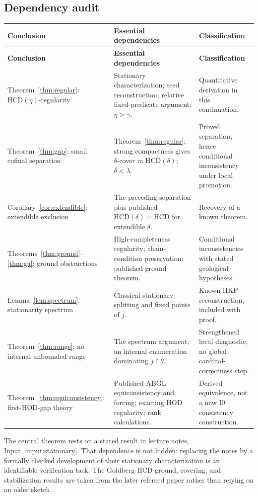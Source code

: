 \documentclass[11pt,letterpaper]{article}
\theoremstyle{definition}
\newcommand{\restr}{\mathbin{\upharpoonright}}
\newcommand{\Izero}{\mathrm{I0}}
\newcommand{\HCD}{\mathrm{HCD}}
\theoremstyle{remark}
\begin{document}
\subsection{Dependency audit}

\begingroup\small
\renewcommand{\arraystretch}{1.16}
\begin{longtable}{@{}P{.23\textwidth}P{.40\textwidth}P{.29\textwidth}@{}}
\toprule
\textbf{Conclusion} & \textbf{Essential dependencies} & \textbf{Classification}\\\midrule\endfirsthead
\toprule\textbf{Conclusion}&\textbf{Essential dependencies}&\textbf{Classification}\\\midrule\endhead
Theorem~\ref{thm:regular}: $\HCD(\eta)$-regularity & Stationary characterization; seed reconstruction; relative fixed-predicate argument; $\eta>\gamma$. & Quantitative derivation in this continuation.\\[5pt]
Theorem~\ref{thm:gap}: small cofinal separation & Theorem~\ref{thm:regular}; strong compactness gives $\delta$-cover in $\HCD(\delta)$; $\delta<\lambda$. & Proved separation, hence conditional inconsistency under local promotion.\\[5pt]
Corollary~\ref{cor:extendible}: extendible exclusion & The preceding separation plus published $\HCD(\delta)=\HCD$ for extendible $\delta$. & Recovery of a known theorem.\\[5pt]
Theorems~\ref{thm:ground}--\ref{thm:ga}: ground obstructions & High-completeness regularity; chain-condition preservation; published ground theorem. & Conditional inconsistencies with stated geological hypotheses.\\[5pt]
Lemma~\ref{lem:spectrum}: stationarity spectrum & Classical stationary splitting and fixed points of $j$. & Known HKP reconstruction, included with proof.\\[5pt]
Theorem~\ref{thm:range}: no internal unbounded range & The spectrum argument; an internal enumeration dominating $j\restr\theta$. & Strengthened local diagnostic; no global cardinal-correctness step.\\[5pt]
Theorem~\ref{thm:equiconsistency}: first-HOD-gap theory & Published ABGL equiconsistency and forcing; exacting HOD regularity; rank calculations. & Derived equivalence, not a new $\Izero$ consistency construction.\\
\bottomrule
\end{longtable}
\endgroup

The central theorem rests on a stated result in lecture notes, Input~\ref{input:stationary}. That dependence is not hidden: replacing the notes by a formally checked development of their stationary characterization is an identifiable verification task. The Goldberg HCD ground, covering, and stabilization results are taken from the later refereed paper rather than relying on an older sketch.
\end{document}
